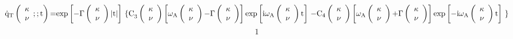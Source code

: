 \documentclass{article}
\begin{document}
\[{\dot{{\rm q}}}_{{\rm T}}\left( \begin{array}{c}
{\mathbf \kappa } \\ 
\nu  \end{array}
;;{\rm t}\right){\rm =}{\exp  \left[{\rm -}\Gamma \left( \begin{array}{c}
{\mathbf \kappa } \\ 
\nu  \end{array}
\right)\left|{\rm t}\right|\right]\ }{\{{\rm C}}_{{\rm 3}}\left( \begin{array}{c}
{\mathbf \kappa } \\ 
\nu  \end{array}
\right)\left[{\omega }_{{\rm A}}\left( \begin{array}{c}
{\mathbf \kappa } \\ 
\nu  \end{array}
\right){\rm -}\Gamma \left( \begin{array}{c}
{\mathbf \kappa } \\ 
\nu  \end{array}
\right)\right]{\exp  \left[{\rm i}{\omega }_{{\rm A}}\left( \begin{array}{c}
{\mathbf \kappa } \\ 
\nu  \end{array}
\right){\rm t}\right]\ }{\rm -}{{\rm C}}_{{\rm 4}}\left( \begin{array}{c}
{\mathbf \kappa } \\ 
\nu  \end{array}
\right){\left[{\omega }_{{\rm A}}\left( \begin{array}{c}
{\mathbf \kappa } \\ 
\nu  \end{array}
\right){\rm +}\Gamma \left( \begin{array}{c}
{\mathbf \kappa } \\ 
\nu  \end{array}
\right)\right]\exp  \left[{\rm -}{\rm i}{\omega }_{{\rm A}}\left( \begin{array}{c}
{\mathbf \kappa } \\ 
\nu  \end{array}
\right){\rm t}\right]\ }\}\] 
\[1\] 
\end{document}
